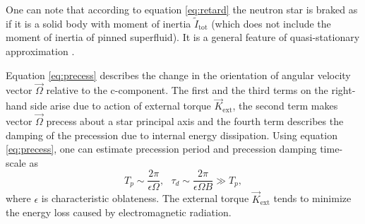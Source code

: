 \documentclass[a4paper]{jpconf}
\begin{document}
    One can note that according to equation \eqref{eq:retard} the neutron star is braked as if it is a solid body with moment of inertia $\tilde{I}_\mathrm{tot}$ (which does not include the moment of inertia of pinned superfluid).
    It is a general feature of quasi-stationary approximation \cite[section 2.3]{BGT2014}.    
    
    Equation \eqref{eq:precess} describes the change in the orientation of angular velocity vector $\vec{\Omega}$ relative to the c-component.
    The first and the third terms on the right-hand side arise due to action of external torque $\vec{K}_\mathrm{ext}$, the second term makes vector $\vec{\Omega}$ precess about a star principal axis and the fourth term describes the damping of the precession due to internal energy dissipation. 
    Using equation \eqref{eq:precess},
    one can estimate precession period and precession damping time-scale as
    \begin{equation}
      \label{eq:T_p-tau_p}
      T_p \sim \frac{2\pi}{\epsilon\Omega}, \ \ \
      \tau_d \sim \frac{2\pi}{\epsilon\Omega B} \gg T_p,   
    \end{equation}
    where $\epsilon$ is characteristic oblateness. 
    The external torque $\vec{K}_\mathrm{ext}$ tends to minimize the energy loss caused by electromagnetic radiation. 
\end{document}
